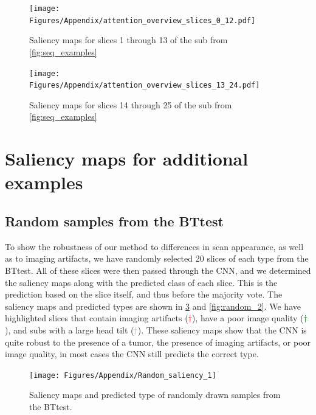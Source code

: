 \begin{subappendices}
\begin{figure}[ht]
\texttt{[image: Figures/Appendix/attention\_overview\_slices\_0\_12.pdf]}
\caption{Saliency maps for \glspl{slice} 1 through 13 of the \gls{sub} from \cref{fig:seq_examples}}
\label{fig:saliency_lower_slices}
\end{figure}

\begin{figure}[ht]
\texttt{[image: Figures/Appendix/attention\_overview\_slices\_13\_24.pdf]}
\caption{Saliency maps for \glspl{slice} 14 through 25 of the \gls{sub} from \cref{fig:seq_examples}}
\label{fig:saliency_upper_slices}
\end{figure}


\clearpage

\section{Saliency maps for additional examples}
\label{app:artifactsaliency}

\subsection{Random samples from the \gls{BTtest}}
\label{app:randomtumorsample}

To show the robustness of our method to differences in \gls{scan} appearance, as well as to imaging artifacts, we have randomly selected 20 \glspl{slice} of each \gls{type} from the \gls{BTtest}.
All of these \glspl{slice} were then passed through the \gls{CNN}, and we determined the saliency maps along with the predicted \gls{class} of each \gls{slice}.
This is the prediction based on the \gls{slice} itself, and thus before the majority vote.
The saliency maps and predicted \glspl{type} are shown in \cref{fig:random_1} and \cref{fig:random_2}.
We have highlighted \glspl{slice} that contain imaging artifacts (\textcolor{red}{$\dagger$}), have a poor image quality (\textcolor{green}{$\dagger$}), and \glspl{sub} with a large head tilt  (\textcolor{cyan}{$\dagger$}).
These saliency maps show that the \gls{CNN} is quite robust to the presence of a tumor, the presence of imaging artifacts, or poor image quality, in most cases the \gls{CNN} still predicts the correct \gls{type}.
%

\begin{figure}[ht]
    \centering
    \texttt{[image: Figures/Appendix/Random\_saliency\_1]}

    \caption{Saliency maps and predicted \gls{type} of randomly drawn \glspl{sample} from the \gls{BTtest}.}
    \label{fig:random_1}
\end{figure}


\end{subappendices}
